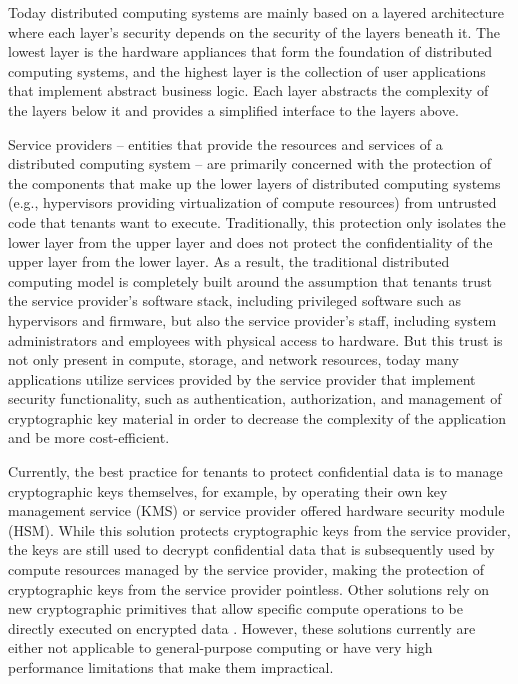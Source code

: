 Today distributed computing systems are mainly based on a layered architecture
where each layer's security depends on the security of the layers beneath it.
The lowest layer is the hardware appliances that form the foundation of
distributed computing systems, and the highest layer is the collection of user
applications that implement abstract business logic. Each layer abstracts the
complexity of the layers below it and provides a simplified interface to the
layers above.

Service providers -- entities that provide the resources and services of a
distributed computing system -- are primarily concerned with the protection of
the components that make up the lower layers of distributed computing systems
(e.g., hypervisors providing virtualization of compute resources) from untrusted
code that tenants want to execute. Traditionally, this protection only isolates
the lower layer from the upper layer and does not protect the confidentiality of
the upper layer from the lower layer. As a result, the traditional distributed
computing model is completely built around the assumption that tenants trust the
service provider's software stack, including privileged software such as
hypervisors and firmware, but also the service provider's staff, including
system administrators and employees with physical access to hardware. But this
trust is not only present in compute, storage, and network resources, today many
applications utilize services provided by the service provider that implement
security functionality, such as authentication, authorization, and management of
cryptographic key material in order to decrease the complexity of the
application and be more cost-efficient.

Currently, the best practice for tenants to protect confidential data is to
manage cryptographic keys themselves, for example, by operating their own key
management service (KMS) or service provider offered hardware security module
(HSM). While this solution protects cryptographic keys from the service
provider, the keys are still used to decrypt confidential data that is
subsequently used by compute resources managed by the service provider, making
the protection of cryptographic keys from the service provider pointless. Other
solutions rely on new cryptographic primitives that allow specific compute
operations to be directly executed on encrypted data
\cite{monique2013homomorphicencryption, bellare2007searchableencryption}.
However, these solutions currently are either not applicable to general-purpose
computing or have very high performance limitations that make them impractical.

